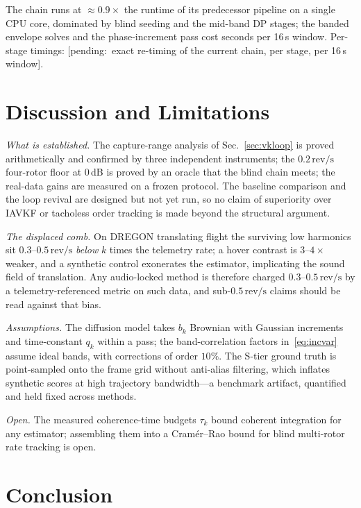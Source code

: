 \documentclass[journal]{IEEEtran}
\newcommand{\revps}{\ensuremath{\,\mathrm{rev/s}}}
\newcommand{\pending}[1]{{\color{gray}\textsf{[pending:~#1]}}}
\begin{document}
The chain runs at ${\approx}0.9\times$ the runtime of its predecessor
pipeline on a single CPU core, dominated by blind seeding and the
mid-band DP stages; the banded envelope solves and the phase-increment
pass cost seconds per 16\,s window. Per-stage timings: \pending{exact
re-timing of the current chain, per stage, per 16\,s window}.

\section{Discussion and Limitations}
\label{sec:discussion}

\emph{What is established.} The capture-range analysis of
Sec.~\ref{sec:vkloop} is proved arithmetically and confirmed by three
independent instruments; the $0.2\revps$ four-rotor floor at 0\,dB is
proved by an oracle that the blind chain meets; the real-data gains are
measured on a frozen protocol. The baseline comparison and the loop
revival are designed but not yet run, so no claim of superiority over
IAVKF or tacholess order tracking is made beyond the structural argument.

\emph{The displaced comb.} On DREGON translating flight the surviving low
harmonics sit $0.3$--$0.5\revps$ \emph{below} $k$ times the telemetry
rate; a hover contrast is $3$--$4\times$ weaker, and a synthetic control
exonerates the estimator, implicating the sound field of translation. Any
audio-locked method is therefore charged $0.3$--$0.5\revps$ by a
telemetry-referenced metric on such data, and sub-$0.5\revps$ claims
should be read against that bias.

\emph{Assumptions.} The diffusion model takes $b_k$ Brownian with
Gaussian increments and time-constant $q_k$ within a pass; the
band-correlation factors in~\eqref{eq:incvar} assume ideal bands, with
corrections of order $10\%$. The S-tier ground truth is point-sampled
onto the frame grid without anti-alias filtering, which inflates
synthetic scores at high trajectory bandwidth---a benchmark artifact,
quantified and held fixed across methods.

\emph{Open.} The measured coherence-time budgets $\tau_k$ bound coherent
integration for any estimator; assembling them into a Cram\'er--Rao
bound for blind multi-rotor rate tracking is open.

\section{Conclusion}
\label{sec:conclusion}
\end{document}

